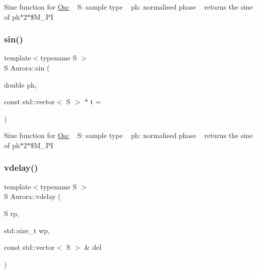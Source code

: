 Sine function for \hyperlink{class_aurora_1_1_osc}{Osc} ~\newline
S\+: sample type ~\newline
ph\+: normalised phase ~\newline
returns the sine of ph$\ast$2$\ast$\$\+M\+\_\+\+PI \mbox{\label{namespace_aurora_a76909b8c5d5801213d35fffa69499885}} 
\subsubsection{\texorpdfstring{sin()}{sin()}\hspace{0.1cm}{\footnotesize\ttfamily [2/2]}}
{\footnotesize\ttfamily template$<$typename S $>$ \\
S Aurora\+::sin (\begin{DoxyParamCaption}\item[{double}]{ph,  }\item[{const std\+::vector$<$ S $>$ $\ast$}]{t = {} }\end{DoxyParamCaption})\hspace{0.3cm}{\ttfamily [inline]}}

Sine function for \hyperlink{class_aurora_1_1_osc}{Osc} ~\newline
S\+: sample type ~\newline
ph\+: normalised phase ~\newline
returns the sine of ph$\ast$2$\ast$\$\+M\+\_\+\+PI \mbox{\label{namespace_aurora_ab93392950e0b9ae8fbbccf7cc1b55a13}} 
\subsubsection{\texorpdfstring{vdelay()}{vdelay()}\hspace{0.1cm}{\footnotesize\ttfamily [1/2]}}
{\footnotesize\ttfamily template$<$typename S $>$ \\
S Aurora\+::vdelay (\begin{DoxyParamCaption}\item[{S}]{rp,  }\item[{std\+::size\+\_\+t}]{wp,  }\item[{const std\+::vector$<$ S $>$ \&}]{del }\end{DoxyParamCaption})}

